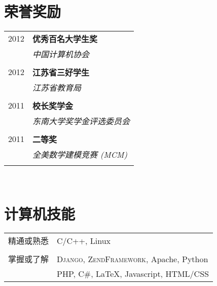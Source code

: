 \documentclass[10pt]{article} %
\begin{document}
{\begin{minipage}[t]{0.44\textwidth}
\begin{tabular}{rl}
\end{tabular}\\[10pt]



\section{荣誉奖励} 

\begin{tabular}{rl}
2012	 & \textbf{优秀百名大学生奖}\\
& \textit{中国计算机协会}\\ \\



2012	 & \textbf{江苏省三好学生}\\
& \textit{江苏省教育局}\\ \\

2011 & \textbf{校长奖学金}\\
& \textit{东南大学奖学金评选委员会} \\ \\

2011	 & \textbf{二等奖}\\
& \textit{全美数学建模竞赛 (MCM)}\\ \\

\end{tabular}\\[10pt]


\section{计算机技能} 

\begin{tabular}{ll}
精通或熟悉
& \textsc{C/C++}, Linux \\ 
& \\
掌握或了解
&  \textsc{Django}, \textsc{ZendFramework}, Apache, Python\\
& PHP, \textsc{C\#}, \LaTeX, Javascript, HTML/CSS \\
\end{tabular}


\end{minipage}}
\end{document}
